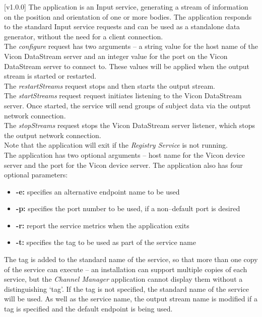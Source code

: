 [v1.0.0]
The  application is an Input service,
generating a stream of information on the position and orientation of one or more bodies.
The application responds to the standard Input service requests and can be used as a
standalone data generator, without the need for a client connection.\\

The \emph{configure} request has two arguments -- a string value for the host name of the
Vicon DataStream server and an integer value for the port on the Vicon DataStream server
to connect to.
These values will be applied when the output stream is started or restarted.\\ 

The \emph{restartStreams} request stops and then starts the output stream.\\

The \emph{startStreams} request request initiates listening to the Vicon DataStream
server.
Once started, the service will send groups of subject data via the output \yarp{} network
connection.\\

The \emph{stopStreams} request stops the Vicon DataStream server listener, which stops the
output \yarp{} network connection.\\ 

Note that the application will exit if the \emph{Registry Service} is not running.\\

The application has two optional arguments -- host name for the Vicon device server and
the port for the Vicon device server.
The application also has four optional parameters:
\begin{itemize}
\item \textbf{-e:} specifies an alternative endpoint name to be used
\item \textbf{-p:} specifies the port number to be used, if a non--default port is desired
\item \textbf{-r:} report the service metrics when the application exits
\item \textbf{-t:} specifies the tag to be used as part of the service name
\end{itemize}
The tag is added to the standard name of the service, so that more than one copy of the
service can execute -- an \mplusm{} installation can support multiple copies of each
 service, but the \emph{Channel Manager} application cannot display them
without a distinguishing `tag'.
If the tag is not specified, the standard name of the service will be used.
As well as the service name, the output stream name is modified if a tag is specified and
the default endpoint is being used.\\

